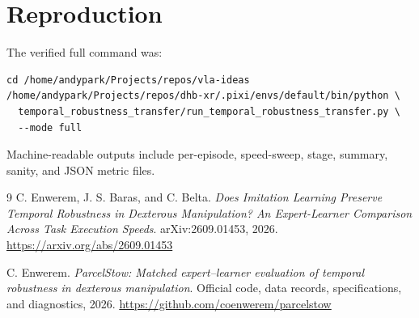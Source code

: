 \documentclass[11pt]{article}
\begin{document}
\section{Reproduction}

The verified full command was:
\begin{verbatim}
cd /home/andypark/Projects/repos/vla-ideas
/home/andypark/Projects/repos/dhb-xr/.pixi/envs/default/bin/python \
  temporal_robustness_transfer/run_temporal_robustness_transfer.py \
  --mode full
\end{verbatim}
Machine-readable outputs include per-episode, speed-sweep, stage, summary, sanity, and JSON metric files.

\begin{thebibliography}{9}
C. Enwerem, J. S. Baras, and C. Belta.
\emph{Does Imitation Learning Preserve Temporal Robustness in Dexterous Manipulation? An Expert-Learner Comparison Across Task Execution Speeds}.
arXiv:2609.01453, 2026.
\url{https://arxiv.org/abs/2609.01453}

C. Enwerem.
\emph{ParcelStow: Matched expert--learner evaluation of temporal robustness in dexterous manipulation}.
Official code, data records, specifications, and diagnostics, 2026.
\url{https://github.com/coenwerem/parcelstow}
\end{thebibliography}
\end{document}
